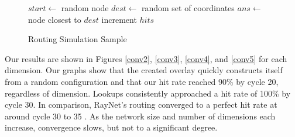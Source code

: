 \begin{figure}
	\caption{Routing Simulation Sample}
	\label{routesim}
	\begin{algorithmic}[1]  %
		\State $start \leftarrow$ random node
		\State $dest \leftarrow$ random set of coordinates
		\State $ans \leftarrow$ node closest to $dest$
		\State increment $hits$
		\EndIf
	\end{algorithmic} 
\end{figure}



Our results are shown in Figures \ref{conv2}, \ref{conv3}, \ref{conv4}, and \ref{conv5} for each dimension.
Our graphs show that the created overlay quickly constructs itself from a random configuration and that our hit rate reached 90\% by cycle 20, regardless of dimension.
Lookups consistently approached a hit rate of 100\% by cycle 30. 
In comparison, RayNet's routing converged to a perfect hit rate at around cycle 30 to 35 \cite{raynet}.
As the network size and number of dimensions each increase, convergence slows, but not to a significant degree.

